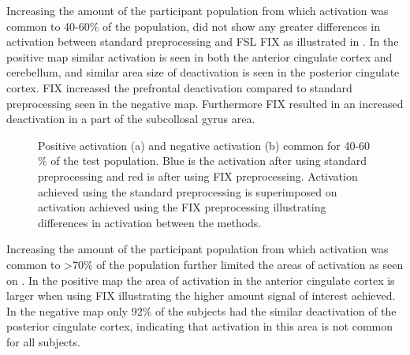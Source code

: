 Increasing the amount of the participant population from which activation was common to 40-60$\percent$ of the population, did not show any greater differences in activation between standard preprocessing and FSL FIX as illustrated in . In the positive map similar activation is seen in both the anterior cingulate cortex and cerebellum, and similar area size of deactivation is seen in the posterior cingulate cortex. FIX increased the prefrontal deactivation compared to standard preprocessing seen in the negative map. Furthermore FIX resulted in an increased deactivation in a part of the subcollosal gyrus area.

\begin{figure}[H]%
	\centering
	\qquad
	\caption{Positive activation (a) and negative activation (b) common for 40-60$\percent$ of the test population. Blue is the activation after using standard preprocessing and red is after using FIX preprocessing. Activation achieved using the standard preprocessing is superimposed on activation achieved using the FIX preprocessing illustrating differences in activation between the methods.}
	\label{fig:40}
\end{figure}

Increasing the amount of the participant population from which activation was common to >70$\%$ of the population further limited the areas of activation as seen on . In the positive map the area of activation in the anterior cingulate cortex is larger when using FIX illustrating the higher amount signal of interest achieved. In the negative map only 92$\percent$ of the subjects had the similar deactivation of the posterior cingulate cortex, indicating that activation in this area is not common for all subjects. 

